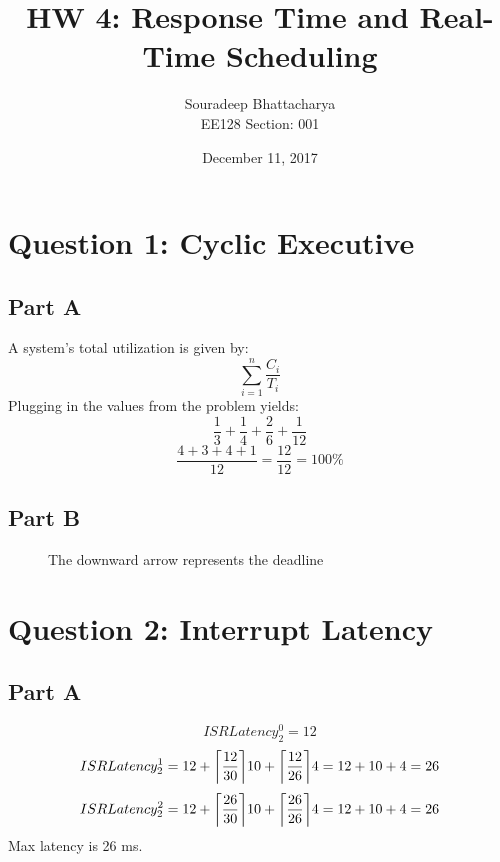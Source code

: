 \documentclass{article}
\title{HW 4: Response Time and Real-Time Scheduling}
\date{December 11, 2017}
\author{Souradeep Bhattacharya \\ EE128 Section: 001}
\DeclarePairedDelimiter\ceil{\lceil}{\rceil}
\begin{document}
	\maketitle
	\section*{Question 1: Cyclic Executive}
	\subsection*{Part A}
	A system's total utilization is given by:
	$$ \sum\limits_{i=1}^n \frac{C_i}{T_i}$$
	Plugging in the values from the problem yields:
	$$ \frac{1}{3}+\frac{1}{4}+\frac{2}{6}+\frac{1}{12}$$
	$$ \frac{4+3+4+1}{12}=\frac{12}{12}=100\% $$
	\subsection*{Part B}
	\begin{figure}[H]
		\begin{RTGrid}[width=11cm]{4}{13}
			
			
			
			
			
			
			
			
			
		\end{RTGrid}
		\centering
		\caption{The downward arrow represents the deadline}
	\end{figure}
	\section*{Question 2: Interrupt Latency}
	\subsection*{Part A}
	$$ ISRLatency_2^0 = 12 $$
	$$ ISRLatency_2^1 = 12 + \ceil*{\frac{12}{30}}10+\ceil*{\frac{12}{26}}4=12+10+4=26$$
	$$ ISRLatency_2^2 = 12 + \ceil*{\frac{26}{30}}10+\ceil*{\frac{26}{26}}4=12+10+4=26$$
	Max latency is 26 ms.
\end{document}
